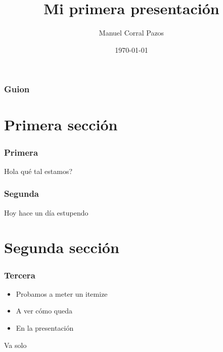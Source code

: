 \documentclass[11pt]{beamer}
\begin{document}
	\author{Manuel Corral Pazos}
	\title{Mi primera presentación}
	\date{\today}
	\begin{frame}[plain]
		\maketitle
	\end{frame}
	
	\begin{frame}
		\frametitle{Guion}
		\tableofcontents
	\end{frame}
	
\section{Primera sección}
	\begin{frame}
		\frametitle{Primera}
		Hola qué tal estamos?
	\end{frame}

	\begin{frame}
		\frametitle{Segunda}
		Hoy hace un día estupendo
	\end{frame}
\section{Segunda sección}
	\begin{frame}
		\frametitle{Tercera}
		\begin{itemize}
			\item Probamos a meter un itemize
			\item A ver cómo queda
			\item En la presentación
		\end{itemize}
	Va solo
	\end{frame}
\end{document}
